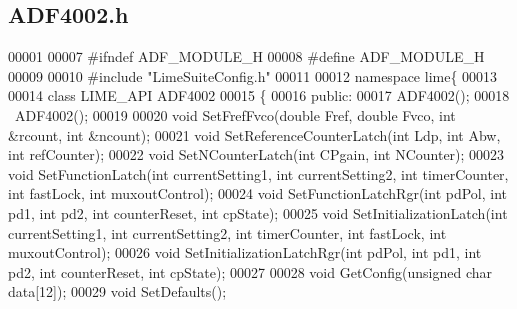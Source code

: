 \subsection{A\+D\+F4002.\+h}
\label{ADF4002_8h_source}

\begin{DoxyCode}
00001 
00007 \textcolor{preprocessor}{#ifndef ADF\_MODULE\_H}
00008 \textcolor{preprocessor}{#define ADF\_MODULE\_H}
00009 
00010 \textcolor{preprocessor}{#include "LimeSuiteConfig.h"}
00011 
00012 \textcolor{keyword}{namespace }lime\{
00013 
00014 \textcolor{keyword}{class }LIME_API ADF4002
00015 \{
00016 \textcolor{keyword}{public}:
00017     ADF4002();
00018     ~ADF4002();
00019 
00020     \textcolor{keywordtype}{void} SetFrefFvco(\textcolor{keywordtype}{double} Fref, \textcolor{keywordtype}{double} Fvco, \textcolor{keywordtype}{int} &rcount, \textcolor{keywordtype}{int} &ncount);
00021     \textcolor{keywordtype}{void} SetReferenceCounterLatch(\textcolor{keywordtype}{int} Ldp, \textcolor{keywordtype}{int} Abw, \textcolor{keywordtype}{int} refCounter);
00022     \textcolor{keywordtype}{void} SetNCounterLatch(\textcolor{keywordtype}{int} CPgain, \textcolor{keywordtype}{int} NCounter);
00023     \textcolor{keywordtype}{void} SetFunctionLatch(\textcolor{keywordtype}{int} currentSetting1, \textcolor{keywordtype}{int} currentSetting2, \textcolor{keywordtype}{int} timerCounter, \textcolor{keywordtype}{int} fastLock, \textcolor{keywordtype}{int} 
      muxoutControl);
00024     \textcolor{keywordtype}{void} SetFunctionLatchRgr(\textcolor{keywordtype}{int} pdPol, \textcolor{keywordtype}{int} pd1, \textcolor{keywordtype}{int} pd2, \textcolor{keywordtype}{int} counterReset, \textcolor{keywordtype}{int} cpState);
00025     \textcolor{keywordtype}{void} SetInitializationLatch(\textcolor{keywordtype}{int} currentSetting1, \textcolor{keywordtype}{int} currentSetting2, \textcolor{keywordtype}{int} timerCounter, \textcolor{keywordtype}{int} fastLock, \textcolor{keywordtype}{
      int} muxoutControl);
00026     \textcolor{keywordtype}{void} SetInitializationLatchRgr(\textcolor{keywordtype}{int} pdPol, \textcolor{keywordtype}{int} pd1, \textcolor{keywordtype}{int} pd2, \textcolor{keywordtype}{int} counterReset, \textcolor{keywordtype}{int} cpState);
00027 
00028     \textcolor{keywordtype}{void} GetConfig(\textcolor{keywordtype}{unsigned} \textcolor{keywordtype}{char} data[12]);
00029     \textcolor{keywordtype}{void} SetDefaults();

\end{DoxyCode}
